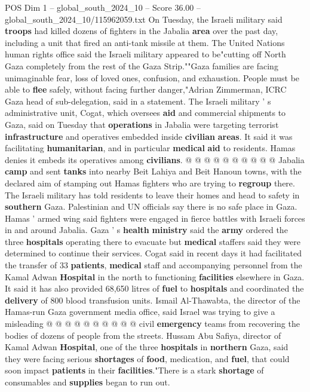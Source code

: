 \begin{textsample}{POS Dim 1 – global\_south\_2024\_10 – Score 36.00 – global\_south\_2024\_10/115962059.txt}
On Tuesday, the Israeli military said \textbf{troops} had killed dozens of fighters in the Jabalia \textbf{area} over the past day, including a unit that fired an anti-tank missile at them.
The United Nations human rights office said the Israeli military appeared to be"cutting off North Gaza completely from the rest of the Gaza Strip.""Gaza families are facing unimaginable fear, loss of loved ones, confusion, and exhaustion.
People must be able to \textbf{flee} safely, without facing further danger,"Adrian Zimmerman, ICRC Gaza head of sub-delegation, said in a statement.
The Israeli military ' s administrative unit, Cogat, which oversees \textbf{aid} and commercial shipments to Gaza, said on Tuesday that \textbf{operations} in Jabalia were targeting terrorist \textbf{infrastructure} and operatives embedded inside \textbf{civilian} \textbf{areas}.
It said it was facilitating \textbf{humanitarian}, and in particular \textbf{medical} \textbf{aid} to residents.
Hamas denies it embeds its operatives among \textbf{civilians}. @ @ @ @ @ @ @ @ @ @ Jabalia \textbf{camp} and sent \textbf{tanks} into nearby Beit Lahiya and Beit Hanoun towns, with the declared aim of stamping out Hamas fighters who are trying to \textbf{regroup} there.
The Israeli military has told residents to leave their homes and head to safety in \textbf{southern} Gaza.
Palestinian and UN officials say there is no safe place in Gaza.
Hamas ' armed wing said fighters were engaged in fierce battles with Israeli forces in and around Jabalia.
Gaza ' s \textbf{health} \textbf{ministry} said the \textbf{army} ordered the three \textbf{hospitals} operating there to evacuate but \textbf{medical} staffers said they were determined to continue their services.
Cogat said in recent days it had facilitated the transfer of 33 \textbf{patients}, \textbf{medical} staff and accompanying personnel from the Kamal Adwan \textbf{Hospital} in the north to functioning \textbf{facilities} elsewhere in Gaza.
It said it has also provided 68,650 litres of \textbf{fuel} to \textbf{hospitals} and coordinated the \textbf{delivery} of 800 blood transfusion units.
Ismail Al-Thawabta, the director of the Hamas-run Gaza government media office, said Israel was trying to give a misleading @ @ @ @ @ @ @ @ @ @ civil \textbf{emergency} teams from recovering the bodies of dozens of people from the streets.
Hussam Abu Safiya, director of Kamal Adwan \textbf{Hospital}, one of the three \textbf{hospitals} in \textbf{northern} Gaza, said they were facing serious \textbf{shortages} of \textbf{food}, medication, and \textbf{fuel}, that could soon impact \textbf{patients} in their \textbf{facilities}."There is a stark \textbf{shortage} of consumables and \textbf{supplies} began to run out.

\end{textsample}
